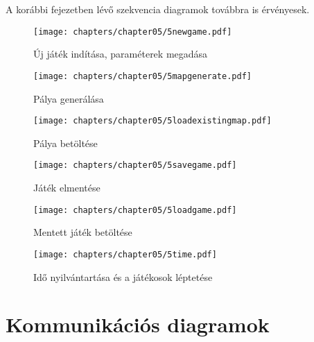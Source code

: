 A korábbi fejezetben lévő szekvencia diagramok továbbra is érvényesek.

\begin{figure}[h]
	\begin{center}
		\texttt{[image: chapters/chapter05/5newgame.pdf]}
		\caption{Új játék indítása, paraméterek megadása}
		\label{fig:5newgame}
	\end{center}
\end{figure}

\begin{figure}[h]
	\begin{center}
		\texttt{[image: chapters/chapter05/5mapgenerate.pdf]}
		\caption{Pálya generálása}
		\label{fig:5mapgenerate}
	\end{center}
\end{figure}

\begin{figure}[h]
	\begin{center}
		\texttt{[image: chapters/chapter05/5loadexistingmap.pdf]}
		\caption{Pálya betöltése}
		\label{fig:5loadexistingmap}
	\end{center}
\end{figure}

\begin{figure}[h]
	\begin{center}
		\texttt{[image: chapters/chapter05/5savegame.pdf]}
		\caption{Játék elmentése}
		\label{fig:5savegame}
	\end{center}
\end{figure}

\begin{figure}[h]
	\begin{center}
		\texttt{[image: chapters/chapter05/5loadgame.pdf]}
		\caption{Mentett játék betöltése}
		\label{fig:5loadgame}
	\end{center}
\end{figure}

\begin{figure}[h]
	\begin{center}
		\texttt{[image: chapters/chapter05/5time.pdf]}
		\caption{Idő nyilvántartása és a játékosok léptetése}
		\label{fig:5time}
	\end{center}
\end{figure}
\clearpage

\section{Kommunikációs diagramok}


